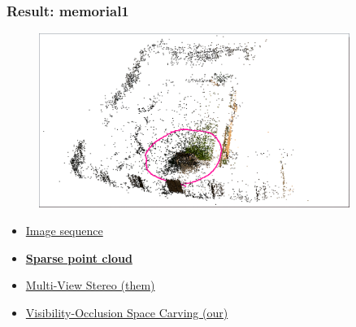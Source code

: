 \documentclass{beamer}
\begin{document}
\begin{frame}
  \frametitle{Result: memorial1}
  \begin{figure}[htb!]
   \centering
   \includegraphics[width=0.9\textwidth]{img/memorial_sparse}  %
  \end{figure}
  \begin{itemize}
    \item \href{run:./vid/09-result3-seq.mp4}{Image sequence} \\
    \item \href{run:./vid/10-result3-sparse.mp4}{\textbf{Sparse point cloud}} \\
    \item \href{run:./vid/11-result3-mvs.mp4}{Multi-View Stereo (them)} \\
    \item \href{run:./vid/12-result3-visocc.mp4}{Visibility-Occlusion Space Carving (our)} \\
  \end{itemize}
\end{frame}
\end{document}
